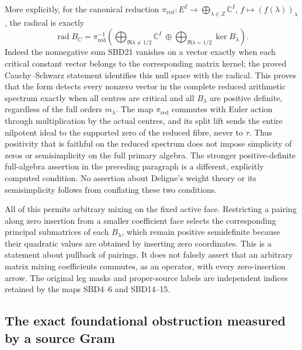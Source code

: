 More explicitly, for the canonical reduction
$\pi_{\mathrm{red}}:E^I\to\bigoplus_{\lambda\in Z}\mathbb C^I$,
$f\mapsto(f(\lambda))_\lambda$, the radical is exactly
\[
 \operatorname{rad}B_C
 =\pi_{\mathrm{red}}^{-1}\left(
       \bigoplus_{\Re\lambda\ne1/2}\mathbb C^I
       \ \oplus\!
       \bigoplus_{\Re\lambda=1/2}\ker B_\lambda\right).
 \tag{SBD21a}
\]
Indeed the nonnegative sum SBD21 vanishes on a vector
exactly when each critical constant vector belongs to the
corresponding matrix kernel; the proved Cauchy--Schwarz
statement identifies this null space with the radical.
This proves that the form detects every nonzero vector in
the complete reduced arithmetic spectrum exactly when all
centres are critical and all $B_\lambda$ are positive
definite, regardless of the full orders $m_\lambda$.
The map $\pi_{\mathrm{red}}$ commutes with Euler action
through multiplication by the actual centres, and its split
lift sends the entire nilpotent ideal to the supported zero
of the reduced fibre, never to $\tau$.
Thus positivity that is faithful on the reduced spectrum
does not impose simplicity of zeros or semisimplicity on
the full primary algebra. The stronger positive-definite
full-algebra assertion in the preceding paragraph is a
different, explicitly computed condition. No assertion
about Deligne's weight theory or its semisimplicity follows
from conflating these two conditions.

All of this permits arbitrary mixing on the fixed active
face. Restricting a pairing along zero insertion from a
smaller coefficient face selects the corresponding principal
submatrices of each $B_\lambda$, which remain positive
semidefinite because their quadratic values are obtained by
inserting zero coordinates. This is a statement about
pullback of pairings. It does not falsely assert that an
arbitrary matrix mixing coefficients commutes, as an operator,
with every zero-insertion arrow. The original leg masks and
proper-source labels are independent indices retained by the
maps SBD4--6 and SBD14--15.

\subsection{The exact foundational obstruction measured by a source Gram}

